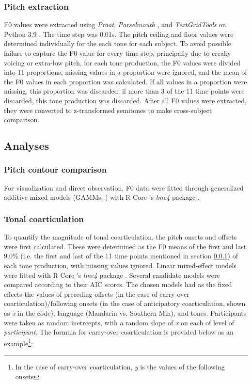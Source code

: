 \documentclass[12pt]{report}
\begin{document}
\begin{CJK}{UTF8}{bsmi}
\subsubsection{Pitch extraction}\label{section:PitchExtraction}
F0 values were extracted using \textit{Praat}, \textit{Parselmouth} \citep{Jadouletal2018}, and \textit{TextGridTools} \citep{BuschmeierWlodarczak2013} on Python 3.9 \citep{vanRossumDrake2009}. The time step was 0.01s. The pitch ceiling and floor values were determined individually for the each tone for each subject. To avoid possible failure to capture the F0 value for every time step, principally due to creaky voicing or extra-low pitch, for each tone production, the F0 values were divided into 11 proportions, missing values in a proportion were ignored, and the mean of the F0 values in each proportion was calculated. If all values in a proportion were missing, this proportion was discarded; if more than 3 of the 11 time points were discarded, this tone production was discarded. After all F0 values were extracted, they were converted to z-transformed semitones to make cross-subject comparison.

\subsection{Analyses}
\subsubsection{Pitch contour comparison}
For visualization and direct observation, F0 data were fitted through generalized additive mixed models (GAMMs; \citealp{Wieling2018}) with R Core \citep{RCoreTeam2019}’s \textit{lme4} package \citep{Batesetal2015}.

\subsubsection{Tonal coarticulation}
To quantify the magnitude of tonal coarticulation, the pitch onsets and offsets were first calculated. These were determined as the F0 means of the first and last 9.0\% (i.e. the first and last of the 11 time points mentioned in section \ref{section:PitchExtraction}) of each tone production, with missing values ignored. Linear mixed-effect models were fitted with R Core \citep{RCoreTeam2019}’s \textit{lme4} package \citep{Batesetal2015}. Several candidate models were compared according to their AIC scores. The chosen models had as the fixed effects the values of preceding offsets (in the case of carry-over coarticulation)/following onsets (in the case of anticipatory coarticulation, shown as \textit{x} in the code), language (Mandarin vs. Southern Min), and tones. Participants were taken as random inetrcepts, with a random slope of \textit{x} on each of level of \textit{participant}. The formula for carry-over coarticulation is provided below as an example\footnote{In the case of carry-over coarticulation, \textit{y} is the values of the following onsets}:


\end{CJK}
\end{document}
